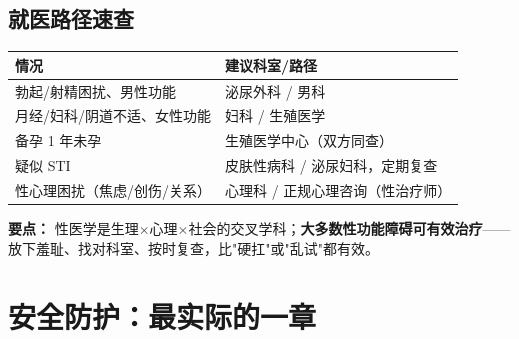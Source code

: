 \documentclass[12pt,UTF8,openany]{ctexbook}
\begin{document}
\section{就医路径速查}

\begin{tabularx}{\textwidth}{lX}
\toprule
情况 & 建议科室/路径 \\
\midrule
勃起/射精困扰、男性功能 & 泌尿外科 / 男科 \\
月经/妇科/阴道不适、女性功能 & 妇科 / 生殖医学 \\
备孕 1 年未孕 & 生殖医学中心（双方同查） \\
疑似 STI & 皮肤性病科 / 泌尿妇科，定期复查 \\
性心理困扰（焦虑/创伤/关系） & 心理科 / 正规心理咨询（性治疗师） \\
\bottomrule
\end{tabularx}

\vspace{1em}
\noindent\textbf{要点：} 性医学是生理$\times$心理$\times$社会的交叉学科；\textbf{大多数性功能障碍可有效治疗}——放下羞耻、找对科室、按时复查，比"硬扛"或"乱试"都有效。

\chapter{安全防护：最实际的一章}
\end{document}
